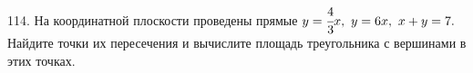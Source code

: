 114. На координатной плоскости проведены прямые $y=\cfrac{4}{3}x,\ y=6x,\ x+y=7.$ Найдите точки их пересечения и вычислите площадь треугольника
с вершинами в этих точках.\\
